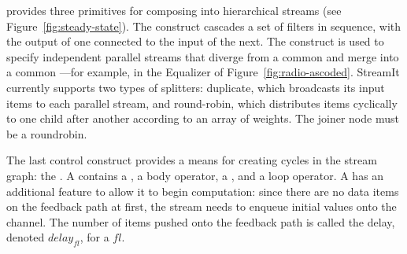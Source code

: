 \documentclass{sig-alt-full}
\begin{document}



{\StreamIt} provides three primitives for composing {\filters} into
hierarchical streams (see Figure~\ref{fig:steady-state}).  The
{\pipeline} construct cascades a set of filters in sequence, with the
output of one connected to the input of the next.  The {\splitjoin}
construct is used to specify independent parallel streams that diverge
from a common {\splitter} and merge into a common {\joiner}---for
example, in the Equalizer of Figure~\ref{fig:radio-ascoded}.  StreamIt
currently supports two types of splitters: duplicate, which broadcasts
its input items to each parallel stream, and round-robin, which
distributes items cyclically to one child after another according to
an array of weights.  The joiner node must be a roundrobin.

The last control construct provides a means for creating cycles in the
stream graph: the {\feedbackloop}. A {\feedbackloop} contains a
{\joiner}, a body operator, a {\splitter}, and a loop operator.  A
{\feedbackloop} has an additional feature to allow it to begin
computation: since there are no data items on the feedback path at
first, the stream needs to enqueue initial values onto the channel.
The number of items pushed onto the feedback path is called the delay,
denoted $delay_{fl}$, for a {\feedbackloop} $fl$.
\end{document}

